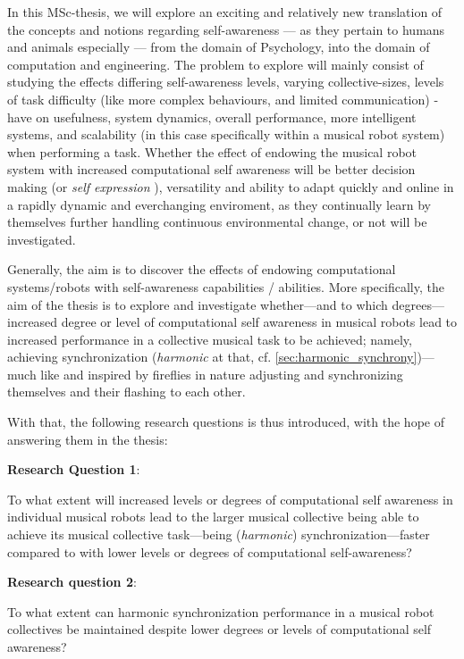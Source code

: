 In this MSc-thesis, we will explore an exciting and relatively new translation of the concepts and notions regarding self-awareness — as they pertain to humans and animals especially — from the domain of Psychology, into the domain of computation and engineering. The problem to explore will mainly consist of studying the effects differing self-awareness levels, varying collective-sizes, levels of task difficulty (like more complex behaviours, and limited communication) - have on usefulness, system dynamics, overall performance, more intelligent systems, and scalability (in this case specifically within a musical robot system) when performing a task. Whether the effect of endowing the musical robot system with increased computational self awareness will be better decision making (or \textit{self expression} \cite{sacs16_ch2}), versatility and ability to adapt quickly and online in a rapidly dynamic and everchanging enviroment, as they continually learn by themselves further handling continuous environmental change, or not will be investigated.

Generally, the aim is to discover the effects of endowing computational systems/robots with self-awareness capabilities / abilities. More specifically, the aim of the thesis is to explore and investigate whether—and to which degrees—increased degree or level of computational self awareness in musical robots lead to increased performance in a collective musical task to be achieved; namely, achieving synchronization (\textit{harmonic} at that, cf. \ref{sec:harmonic_synchrony})—much like and inspired by fireflies in nature adjusting and synchronizing themselves and their flashing to each other.

With that, the following research questions is thus introduced, with the hope of answering them in the thesis: \nl

\textbf{Research Question 1}:

To what extent will increased levels or degrees of computational self awareness in individual musical robots lead to the larger musical collective being able to achieve its musical collective task—being (\textit{harmonic}) synchronization—faster compared to with lower levels or degrees of computational self-awareness? \nl

\textbf{Research question 2}:

To what extent can harmonic synchronization performance in a musical robot collectives be maintained despite lower degrees or levels of computational self awareness? \nl

